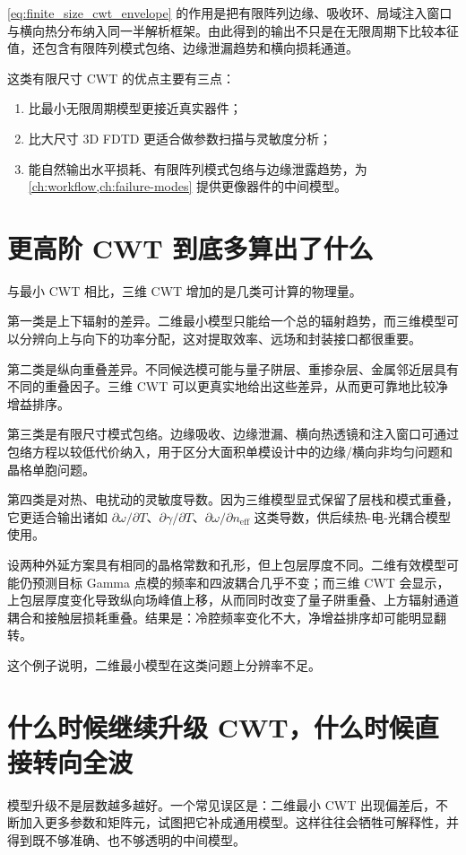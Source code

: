 \cref{eq:finite_size_cwt_envelope} 的作用是把有限阵列边缘、吸收环、局域注入窗口与横向热分布纳入同一半解析框架。由此得到的输出不只是在无限周期下比较本征值，还包含有限阵列模式包络、边缘泄漏趋势和横向损耗通道。

这类有限尺寸 CWT 的优点主要有三点：
\begin{enumerate}
  \item 比最小无限周期模型更接近真实器件；
  \item 比大尺寸 3D FDTD 更适合做参数扫描与灵敏度分析；
  \item 能自然输出水平损耗、有限阵列模式包络与边缘泄露趋势，为 \cref{ch:workflow,ch:failure-modes} 提供更像器件的中间模型。
\end{enumerate}

\section{更高阶 CWT 到底多算出了什么}
与最小 CWT 相比，三维 CWT 增加的是几类可计算的物理量。

第一类是上下辐射的差异。二维最小模型只能给一个总的辐射趋势，而三维模型可以分辨向上与向下的功率分配，这对提取效率、远场和封装接口都很重要。

第二类是纵向重叠差异。不同候选模可能与量子阱层、重掺杂层、金属邻近层具有不同的重叠因子。三维 CWT 可以更真实地给出这些差异，从而更可靠地比较净增益排序。

第三类是有限尺寸模式包络。边缘吸收、边缘泄漏、横向热透镜和注入窗口可通过包络方程以较低代价纳入，用于区分大面积单模设计中的边缘/横向非均匀问题和晶格单胞问题。

第四类是对热、电扰动的灵敏度导数。因为三维模型显式保留了层栈和模式重叠，它更适合输出诸如 $\partial\omega/\partial T$、$\partial\gamma/\partial T$、$\partial\omega/\partial n_{\mathrm{eff}}$ 这类导数，供后续热-电-光耦合模型使用。

设两种外延方案具有相同的晶格常数和孔形，但上包层厚度不同。二维有效模型可能仍预测目标 Gamma 点模的频率和四波耦合几乎不变；而三维 CWT 会显示，上包层厚度变化导致纵向场峰值上移，从而同时改变了量子阱重叠、上方辐射通道耦合和接触层损耗重叠。结果是：冷腔频率变化不大，净增益排序却可能明显翻转。

这个例子说明，二维最小模型在这类问题上分辨率不足。

\section{什么时候继续升级 CWT，什么时候直接转向全波}
模型升级不是层数越多越好。一个常见误区是：二维最小 CWT 出现偏差后，不断加入更多参数和矩阵元，试图把它补成通用模型。这样往往会牺牲可解释性，并得到既不够准确、也不够透明的中间模型。

